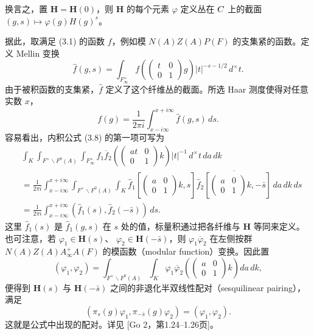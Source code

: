换言之，置 $\mathbf H=\mathbf H(0)$，则 $\mathbf H$ 的每个元素 $\varphi$ 定义丛在 $C$ 上的截面
$(g,s)\mapsto\varphi(g)H(g)^s$。

据此，取满足 (3.1) 的函数 $f$，例如模 $N(A)Z(A)P(F)$ 的支集紧的函数。定义 Mellin 变换
\[
 \widehat f(g,s)=\int_{F_\infty^+}
 f\!\left(\begin{pmatrix}t&0\\0&1\end{pmatrix}g\right)|t|^{-s-1/2}\,d^\times t.
\]
由于被积函数的支集紧，$\widehat f$ 定义了这个纤维丛的截面。所选 Haar 测度使得对任意实数 $x$，
\[
 f(g)=\frac1{2\pi i}\int_{x-i\infty}^{x+i\infty}\widehat f(g,s)\,ds.
\]
容易看出，内积公式 (3.8) 的第一项可写为
\[
\begin{aligned}
 &\int_K\int_{F^\times\backslash F^0(A)}\int_{F_\infty^+}
 f_1\overline f_2\!\left(\begin{pmatrix}at&0\\0&1\end{pmatrix}k\right)|t|^{-1}\,d^\times t\,da\,dk\\
 &=\frac1{2\pi i}\int_{x-i\infty}^{x+i\infty}
 \int_{F^\times\backslash F^0(A)}\int_K
 \widehat f_1\!\left[\begin{pmatrix}a&0\\0&1\end{pmatrix}k,s\right]
 \overline{\widehat f_2\!\left[\begin{pmatrix}a&0\\0&1\end{pmatrix}k,-\bar s\right]}\,da\,dk\,ds\\
 &=\frac1{2\pi i}\int_{x-i\infty}^{x+i\infty}
 (\widehat f_1(s),\widehat f_2(-\bar s))\,ds.
\end{aligned}
\]
这里 $\widehat f_1(s)$ 是 $\widehat f_1(g,s)$ 在 $s$ 处的值，标量积通过把各纤维与
$\mathbf H$ 等同来定义。也可注意，若 $\varphi_1\in\mathbf H(s)$、
$\varphi_2\in\mathbf H(-\bar s)$，则 $\varphi_1\overline\varphi_2$ 在左侧按群
$N(A)Z(A)A_\infty^+A(F)$ 的模函数（modular function）变换。因此置
\begin{equation}
 (\varphi_1,\varphi_2)=\int_{F^\times\backslash F^0(A)}\int_K
 \varphi_1\overline\varphi_2\!\left(\begin{pmatrix}a&0\\0&1\end{pmatrix}k\right)da\,dk,\tag{3.15}
\end{equation}
便得到 $\mathbf H(s)$ 与 $\mathbf H(-\bar s)$ 之间的非退化半双线性配对（sesquilinear pairing），满足
\begin{equation}
 (\pi_s(g)\varphi_1,\pi_{-\bar s}(g)\varphi_2)=(\varphi_1,\varphi_2).\tag{3.16}
\end{equation}
这就是公式中出现的配对。详见 [Go 2，第1.24--1.26页]。

